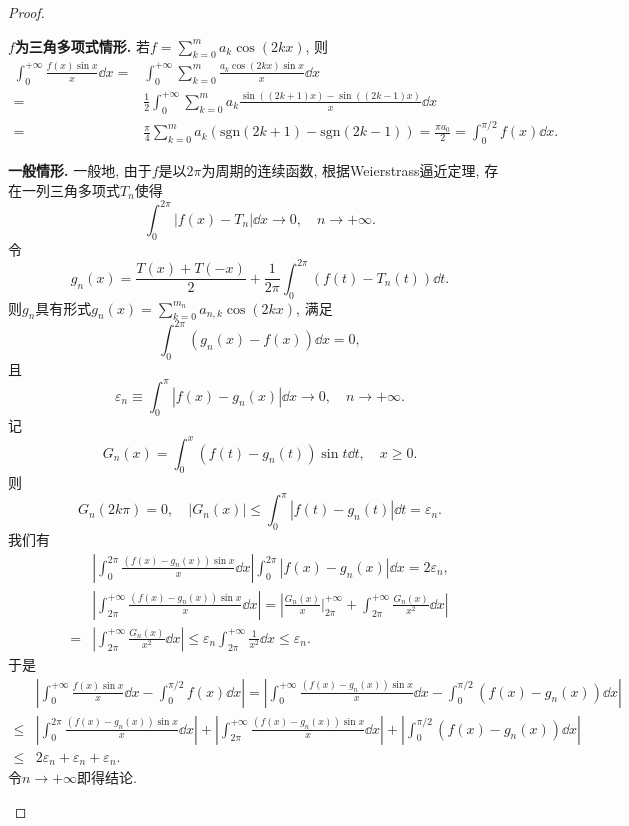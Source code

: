 \begin{quiza}
\begin{proof}
\begin{asparaenum}[(i)]
\item\textbf{\(f\)为三角多项式情形.} 若\(f=\sum_{k=0}^{m}a_k\cos (2kx)\), 则\[\begin{split}
\int_{0}^{+\infty}\frac{f(x)\sin x}{x}\dd x=&\int_{0}^{+\infty}\sum_{k=0}^{m}\frac{a_k\cos(2kx)\sin x}{x}\dd x\\=&\frac{1}{2}\int_{0}^{+\infty}\sum_{k=0}^{m}a_k\frac{\sin\left((2k+1)x\right)-\sin\left((2k-1)x\right)}{x}\dd x\\=&\frac{\pi}{4}\sum_{k=0}^{m}a_k\left(\mathrm{sgn}(2k+1)-\mathrm{sgn}(2k-1)\right)=\frac{\pi a_0}{2}=\int_{0}^{\pi/2}f(x)\dd x.
\end{split}\]
\item\textbf{一般情形.} 一般地, 由于\(f\)是以\(2\pi\)为周期的连续函数, 根据Weierstrass逼近定理, 存在一列三角多项式\(T_n\)使得\[\int_{0}^{2\pi}\left|f(x)-T_n\right|\dd x\rightarrow 0,\quad n\rightarrow+\infty.\]令\[g_n(x)=\frac{T(x)+T(-x)}{2}+\frac{1}{2\pi}\int_{0}^{2\pi}\left(f(t)-T_n(t)\right)\dd t.\]则\(g_n\)具有形式\(g_n(x)=\sum_{k=0}^{m_n}a_{n,k}\cos(2kx)\), 满足\[\int_{0}^{2\pi}\left(g_n(x)-f(x)\right)\dd x=0,\]且\[\varepsilon_n\equiv\int_{0}^{\pi}\left|f(x)-g_n(x)\right|\dd x\rightarrow 0,\quad n\rightarrow+\infty.\]记\[G_n(x)=\int_{0}^{x}\left(f(t)-g_n(t)\right)\sin t\dd t,\quad x\geqslant 0.\]则\[G_n(2k\pi)=0,\quad\left|G_n(x)\right|\leqslant\int_{0}^{\pi}\left|f(t)-g_n(t)\right|\dd t=\varepsilon_n.\]我们有\[\begin{split}
&\left|\int_{0}^{2\pi}\frac{\left(f(x)-g_n(x)\right)\sin x}{x}\dd x\right|\int_{0}^{2\pi}\left|f(x)-g_n(x)\right|\dd x=2\varepsilon_n,\\
&\left|\int_{2\pi}^{+\infty}\frac{\left(f(x)-g_n(x)\right)\sin x}{x}\dd x\right|=\left|\frac{G_n(x)}{x}\Big|_{2\pi}^{+\infty}+\int_{2\pi}^{+\infty}\frac{G_n(x)}{x^2}\dd x\right|\\=&\left|\int_{2\pi}^{+\infty}\frac{G_n(x)}{x^2}\dd x\right|\leqslant\varepsilon_n\int_{2\pi}^{+\infty}\frac{1}{x^2}\dd x\leqslant \varepsilon_n.
\end{split}\]
于是\[\begin{split}
&\left|\int_{0}^{+\infty}\frac{f(x)\sin x}{x}\dd x-\int_{0}^{\pi/2}f(x)\dd x\right|=\left|\int_{0}^{+\infty}\frac{\left(f(x)-g_n(x)\right)\sin x}{x}\dd x-\int_{0}^{\pi/2}\left(f(x)-g_n(x)\right)\dd x\right|\\\leqslant & \left|\int_{0}^{2\pi}\frac{\left(f(x)-g_n(x)\right)\sin x}{x}\dd x\right|+\left|\int_{2\pi}^{+\infty}\frac{\left(f(x)-g_n(x)\right)\sin x}{x}\dd x\right|+\left|\int_{0}^{\pi/2}\left(f(x)-g_n(x)\right)\dd x\right|\\\leqslant &2\varepsilon_n+\varepsilon_n+\varepsilon_n.
\end{split}\]令\(n\rightarrow+\infty\)即得结论.
\end{asparaenum}


\end{proof}
\end{quiza}
